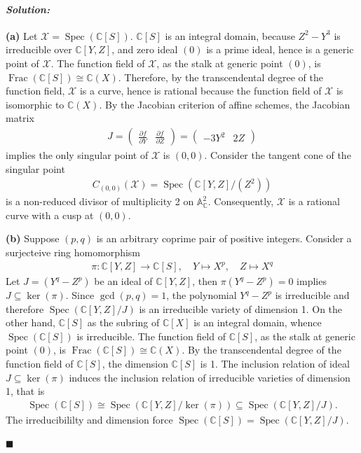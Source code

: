 \documentclass[12pt, a4paper]{article}
\newenvironment{solution}
  {\paragraph{\textit{Solution:}}\par\medskip}
  {\hfill$\blacksquare$\vspace{0.1cm}}
\begin{document}
\begin{solution}
\textbf{(a)} Let $\mathcal{X}=\operatorname{Spec}(\mathbb{C}[S])$. $\mathbb{C}[S]$ is an integral domain, because $Z^2-Y^3$ is irreducible over $\mathbb{C}[Y,Z]$, and zero ideal $(0)$ is a prime ideal, hence is a generic point of $\mathcal{X}$.
The function field of $\mathcal{X}$, as the stalk at generic point $(0)$, is $\operatorname{Frac}(\mathbb{C}[S])\cong \mathbb{C}(X)$. Therefore, 
by the transcendental degree of the function field, $\mathcal{X}$ is a curve, hence is rational because the function field of $\mathcal{X}$ is isomorphic to $\mathbb{C}(X)$.
By the Jacobian criterion of affine schemes, the Jacobian matrix 
\begin{align*}
    J = \begin{pmatrix} \frac{\partial f}{\partial Y} & \frac{\partial f}{\partial Z} \end{pmatrix} = \begin{pmatrix} -3Y^2 & 2Z \end{pmatrix}
\end{align*}
implies the only singular point of $\mathcal{X}$ is $(0,0)$. Consider the tangent cone of the singular point
\begin{align*}
    C_{(0,0)}(\mathcal{X}) = \operatorname{Spec}(\mathbb{C}[Y, Z] / (Z^2))
\end{align*}
is a non-reduced divisor of multiplicity 2 on $\mathbb{A}_{\mathbb{C}}^2$. Consequently, $\mathcal{X}$ is a rational curve with a cusp at $(0,0)$.

\textbf{(b)}
Suppose $(p,q)$ is an arbitrary coprime pair of positive integers. Consider a surjecteive ring homomorphism
\begin{align*}
    \pi: \mathbb{C}[Y,Z] \to \mathbb{C}[S], \quad
    Y\mapsto X^p, \quad
    Z\mapsto X^q
\end{align*}
Let $J=(Y^q-Z^p)$ be an ideal of $\mathbb{C}[Y,Z]$, then $\pi(Y^q-Z^p) = 0$ implies $J\subseteq \ker(\pi)$.
Since $\operatorname{gcd}(p,q)=1$, the polynomial $Y^q-Z^p$ is irreducible and therefore $\operatorname{Spec}(\mathbb{C}[Y,Z]/J)$ is an irreducible variety of dimension 1.
On the other hand, $\mathbb{C}[S]$ as the subring of $\mathbb{C}[X]$ is an integral domain, whence $\operatorname{Spec}(\mathbb{C}[S])$ is irreducible.
The function field of $\mathbb{C}[S]$, as the stalk at generic point $(0)$, is $\operatorname{Frac}(\mathbb{C}[S])\cong \mathbb{C}(X)$. 
By the transcendental degree of the function field of $\mathbb{C}[S]$, the dimension $\mathbb{C}[S]$ is 1. The inclusion relation of ideal $J\subseteq\ker(\pi)$ induces the inclusion relation of 
irreducible varieties of dimension 1, that is
\begin{align*}
    \operatorname{Spec}(\mathbb{C}[S]) \cong \operatorname{Spec}(\mathbb{C}[Y,Z]/\ker(\pi)) \subseteq \operatorname{Spec}(\mathbb{C}[Y,Z]/J).
\end{align*}
The irreducibililty and dimension force $\operatorname{Spec}(\mathbb{C}[S]) = \operatorname{Spec}(\mathbb{C}[Y,Z]/J)$.


\end{solution}
\end{document}
